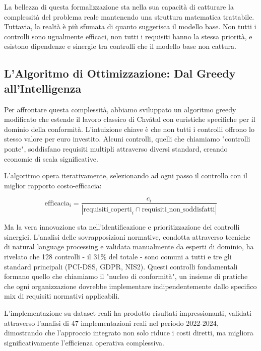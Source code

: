 La bellezza di questa formalizzazione sta nella sua capacità di catturare la complessità del problema reale mantenendo una struttura matematica trattabile. Tuttavia, la realtà è più sfumata di quanto suggerisca il modello base. Non tutti i controlli sono ugualmente efficaci, non tutti i requisiti hanno la stessa priorità, e esistono dipendenze e sinergie tra controlli che il modello base non cattura.

\subsection{L'Algoritmo di Ottimizzazione: Dal Greedy all'Intelligenza}

Per affrontare questa complessità, abbiamo sviluppato un algoritmo greedy modificato che estende il lavoro classico di Chvátal\autocite{Chvatal1979} con euristiche specifiche per il dominio della conformità. L'intuizione chiave è che non tutti i controlli offrono lo stesso valore per euro investito. Alcuni controlli, quelli che chiamiamo "controlli ponte", soddisfano requisiti multipli attraverso diversi standard, creando economie di scala significative.

L'algoritmo opera iterativamente, selezionando ad ogni passo il controllo con il miglior rapporto costo-efficacia:

\begin{equation}
\text{efficacia}_i = \frac{c_i}{|\text{requisiti\_coperti}_i \cap \text{requisiti\_non\_soddisfatti}|}
\label{eq:efficacia}
\end{equation}

Ma la vera innovazione sta nell'identificazione e prioritizzazione dei controlli sinergici. L'analisi delle sovrapposizioni normative, condotta attraverso tecniche di natural language processing e validata manualmente da esperti di dominio, ha rivelato che 128 controlli - il 31\% del totale - sono comuni a tutti e tre gli standard principali (PCI-DSS, GDPR, NIS2). Questi controlli fondamentali formano quello che chiamiamo il "nucleo di conformità", un insieme di pratiche che ogni organizzazione dovrebbe implementare indipendentemente dallo specifico mix di requisiti normativi applicabili.

L'implementazione su dataset reali ha prodotto risultati impressionanti, validati attraverso l'analisi di 47 implementazioni reali nel periodo 2022-2024\autocite{PWC2024}, dimostrando che l'approccio integrato non solo riduce i costi diretti, ma migliora significativamente l'efficienza operativa complessiva.

